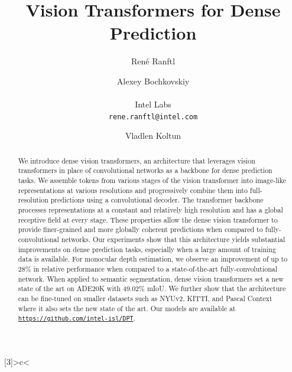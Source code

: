 \documentclass[10pt,twocolumn,letterpaper]{article}
\begin{document}
\title{Vision Transformers for Dense Prediction\vspace{-0.5em}}

\author{Ren\'{e} Ranftl\\
  \and
  Alexey Bochkovskiy\\
  \\Intel Labs\\
  {\tt\small rene.ranftl@intel.com}\\
  \and Vladlen Koltun
}

\maketitle
\ificcvfinal\thispagestyle{empty}\fi

\makeatletter
\newcolumntype{B}[3]{>{\boldmath{}}c<{\DC@end}}
\makeatother

\setlength{\abovecaptionskip}{2ex}
\setlength{\belowcaptionskip}{1ex}
\setlength{\floatsep}{2ex}
\setlength{\textfloatsep}{2ex}

\begin{abstract}
  We introduce dense vision transformers, an architecture that leverages vision
  transformers in place of convolutional networks as a backbone for dense
  prediction tasks. We assemble tokens from various stages of the vision
  transformer into image-like representations at various resolutions and
  progressively combine them into full-resolution predictions using a
  convolutional decoder. The transformer backbone processes representations at a
  constant and relatively high resolution and has a global receptive field at
  every stage. These properties allow the dense vision transformer to provide
  finer-grained and more globally coherent predictions when compared to
  fully-convolutional networks. Our experiments show that this architecture
  yields substantial improvements on dense prediction tasks, especially when a
  large amount of training data is available. For monocular depth estimation, we
  observe an improvement of up to 28\% in relative performance when compared to
  a state-of-the-art fully-convolutional network. When applied to semantic
  segmentation, dense vision transformers set a new state of the art on ADE20K with
  49.02\% mIoU. We further show that the architecture can be
  fine-tuned on smaller datasets such as NYUv2, KITTI, and Pascal Context where
  it also sets the new state of the art. Our models are available at
  \href{https://github.com/intel-isl/DPT}{\small\texttt{https://github.com/intel-isl/DPT}}.
\end{abstract}
\end{document}
